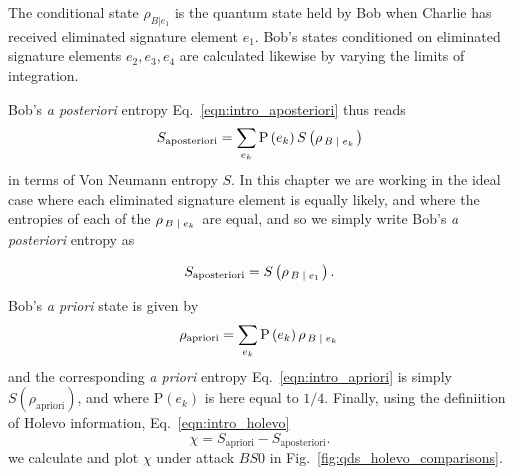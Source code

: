 \noindent The conditional state $\rho_{B|e_1}$ is the quantum state held by Bob when Charlie has received eliminated signature element $e_1$. Bob's states conditioned on eliminated signature elements $e_2, e_3, e_4$ are calculated likewise by varying the limits of integration.

Bob's \emph{a posteriori} entropy Eq.~\ref{eqn:intro_aposteriori} thus reads
\begin{equation}
S_{\text{aposteriori}} = \sum_{e_k} \text{P}\left(e_k\right) S\left(\rho_{\left. B \; \middle| \; e_k\right.}\right)
\end{equation}
in terms of Von Neumann entropy $S$. In this chapter we are working in the ideal case where each eliminated signature element is equally likely, and where the entropies of each of the $\rho_{\left. B \; \middle| \; e_k\right.}$ are equal, and so we simply write Bob's \emph{a posteriori} entropy as

\begin{equation}\label{eqn:aposteriori_entropy}
S_{\text{aposteriori}} = S\left(\rho_{\left. B \; \middle| \; e_1\right.}\right).
\end{equation}

\noindent Bob's \emph{a priori} state is given by
\begin{equation}\label{eqn:qds_aprioristate}
\rho_{\text{apriori}} = \sum_{e_k} \text{P}\left(e_k\right) \rho_{\left. B \; \middle| \; e_k\right.}
\end{equation}
and the corresponding \emph{a priori} entropy Eq.~\ref{eqn:intro_apriori} is simply $S\left(\rho_{\text{apriori}}\right)$, and where $\text{P}\left(e_k\right)$ is here equal to $1/4$. %
Finally, using the definiition of Holevo information, Eq.~\ref{eqn:intro_holevo}
\begin{equation}
\chi = S_{\text{apriori}} - S_{\text{aposteriori}}.
\end{equation}
we calculate and plot $\chi$ under attack $BS0$ in Fig.~\ref{fig:qds_holevo_comparisons}. 

